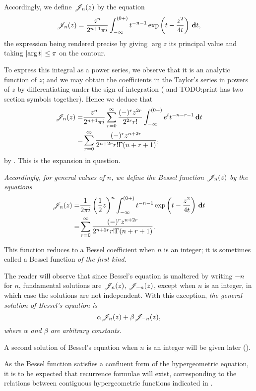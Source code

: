 Accordingly, we define $\mathscr{J}_{n}(z)$ by the equation
$$
\mathscr{J}_{n}(z)
=
\frac{z^{n}}{2^{n+1}\pi i}
\int_{-\infty}^{(0+)}
t^{-n-1}
\exp\left(  t - \frac{z^{2}}{4t}   \right)
\, \mathbf{d} t,
$$
the expression being rendered precise by giving
$\arg z$ its principal value and taking
$\left|  \arg t  \right| \leq \pi$ on the contour.

To express this integral as a power series, we observe that it is an
analytic function of $z$; and we may obtain the coefficients in the
Taylor's series in powers of $z$ by differentiating under the sign of
integration
( and 
TODO:print has two section symbols together).
Hence we deduce that
\begin{align*}
  \mathscr{J}_{n}(z)
  =& \frac{z^{n}}{2^{n+1}\pi i}
  \sum_{r=0}^{\infty} \frac{ (-)^{r} z^{2r}  }{ 2^{2r} r!  }
  \int_{-\infty}^{(0+)}
  e^{t}
  t^{-n-r-1}
  \, \mathbf{d} t
  \\
  =&
  \sum_{r=0}^{\infty}
  \frac{ (-)^{r} z^{n+2r}  }{ 2^{n+2r} r! \Gamma(n+r+1)  },
\end{align*}
by . This is the expansion in question.

%
%
\emph{Accordingly, for general values of $n$, we define the
  \emph{Bessel function} $\mathscr{J}_{n}(z)$ by the equations}
\begin{align*}
  \mathscr{J}_{n}(z)
  =& \frac{1}{2\pi i} \left( \frac{1}{2} z \right)^{n}
  \int_{-\infty}^{(0+)}
  t^{-n-1}
  \exp\left(  t - \frac{z^{2}}{4t}   \right)
  \, \mathbf{d} t
  \\
  =&
  \sum_{r=0}^{\infty}
  \frac{ (-)^{r} z^{n+2r}  }{ 2^{n+2r} r! \Gamma(n+r+1)  }.
\end{align*}

This function reduces to a Bessel coefficient when $n$ is an integer;
it is sometimes called a Bessel function \emph{of the first kind}.

The reader will observe that since Bessel's equation is unaltered by
writing $-n$ for $n$, fundamental solutions are $\mathscr{J}_{n}(z)$, $\mathscr{J}_{-n}(z)$,
except when $n$ is an integer, in which case the solutions are not
independent. With this exception, \emph{the general solution of
  Bessel's equation is
  $$
  \alpha \mathscr{J}_{n}(z) + \beta \mathscr{J}_{-n}(z),
  $$
  where $\alpha$ and $\beta$ are arbitrary constants.}

A second solution of Bessel's equation when $n$ is an integer will be
given later ().

As the Bessel function satisfies a confluent form of the
hypergeometric equation, it is to be expected that recurrence formulae
will exist, corresponding to the relations between contiguous
hypergeometric functions indicated in .

